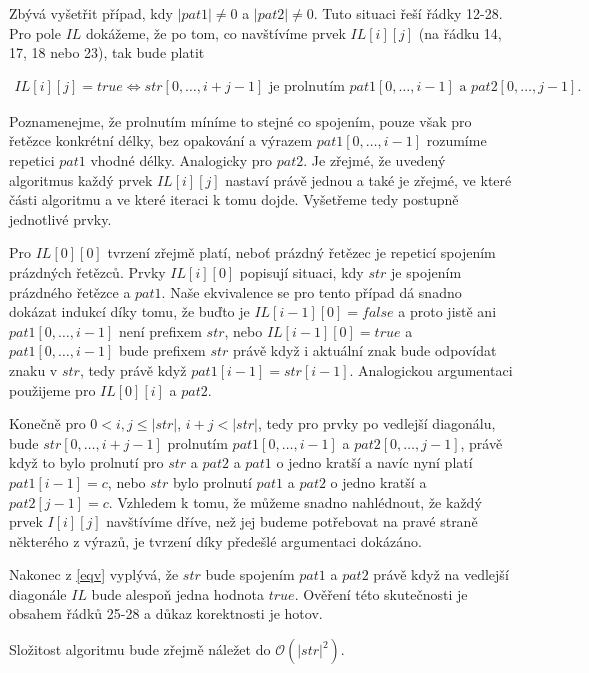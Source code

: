 \documentclass[12pt,a4paper]{article}
\theoremstyle{plain}
\begin{document}
Zbývá vyšetřit případ, kdy $ |pat1| \neq 0$ a $ |pat2| \neq 0 $. Tuto situaci řeší řádky 12-28. Pro pole $ IL $ dokážeme, že po tom, co navštívíme prvek $ IL[i][j] $ (na řádku 14, 17, 18 nebo 23), tak bude platit 

\begin{align}\label{eqv}
IL[i][j] = true \Leftrightarrow str[0,\dots, i + j - 1] \text{ je prolnutím } pat1[0,\dots,i - 1] \text{ a } pat2[0,\dots,j - 1].
\end{align}

 Poznamenejme, že prolnutím míníme to stejné co spojením, pouze však pro řetězce konkrétní délky, bez opakování a výrazem $ pat1[0,\dots,i - 1] $ rozumíme repetici $ pat1 $ vhodné délky. Analogicky pro $ pat2 $. 
Je zřejmé, že uvedený algoritmus každý prvek $ IL[i][j] $ nastaví právě jednou a také je zřejmé, ve které části algoritmu a ve které iteraci k tomu dojde. Vyšetřeme tedy postupně jednotlivé prvky.

Pro $ IL[0][0] $ tvrzení zřejmě platí, neboť prázdný řetězec je repeticí spojením prázdných řetězců. Prvky $ IL[i][0] $ popisují situaci, kdy $ str $ je spojením prázdného řetězce a $ pat1 $. Naše ekvivalence se pro tento případ dá snadno dokázat indukcí díky tomu, že buďto je $ IL[i - 1][0] = false $ a proto jistě ani $ pat1[0,\dots,i - 1] $ není prefixem $ str $, nebo $ IL[i - 1][0] = true $ a $ pat1[0,\dots,i - 1] $ bude prefixem $ str $ právě když i aktuální znak bude odpovídat znaku v $ str $, tedy právě když $ pat1[i-1] = str[i-1] $. Analogickou argumentaci použijeme pro $ IL[0][i] $ a $ pat2 $.

Konečně pro $ 0 < i,j \leq |str| $, $ i + j < |str| $, tedy pro prvky po vedlejší diagonálu, bude $ str[0,\dots, i + j - 1]$ prolnutím $ pat1[0,\dots,i - 1] $ a $ pat2[0,\dots,j - 1] $, právě když to bylo prolnutí pro $ str $ a $ pat2 $ a $ pat1 $ o jedno kratší a navíc nyní platí $ pat1[i-1] = c $, nebo $ str $ bylo prolnutí $ pat1 $ a $ pat2 $ o jedno kratší a $ pat2[j-1] = c $. Vzhledem k tomu, že můžeme snadno nahlédnout, že každý prvek $ I[i][j] $ navštívíme dříve, než jej budeme potřebovat na pravé straně některého z výrazů, je tvrzení díky předešlé argumentaci dokázáno.

Nakonec z \eqref{eqv} vyplývá, že $ str $ bude spojením $ pat1 $ a $ pat2 $ právě když na vedlejší diagonále $ IL $ bude alespoň jedna hodnota $ true $. Ověření této skutečnosti je obsahem řádků 25-28 a důkaz korektnosti je hotov.


Složitost algoritmu bude zřejmě náležet do $\mathcal{O}(|str|^2)$.
\end{document}
